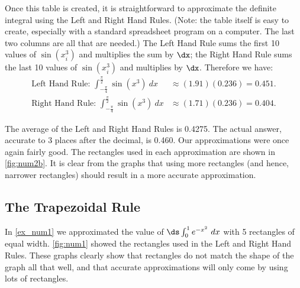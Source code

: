 {Once this table is created, it is straightforward to approximate the definite integral using the Left and Right Hand Rules. (Note: the table itself is easy to create, especially with a standard spreadsheet program on a computer. The last two columns are all that are needed.) The Left Hand Rule sums the first 10 values of $\sin(x_i^3)$ and multiplies the sum by $\dx$; the Right Hand Rule sums the last 10 values of $\sin(x_i^3)$ and multiplies by $\dx$. Therefore we have:
\begin{align*}
	\text{Left Hand Rule: }\int_{-\frac{\pi}4}^{\frac{\pi}2}\sin(x^3)\ dx
	& \approx (1.91)(0.236) = 0.451. \\
	\text{Right Hand Rule: }\int_{-\frac{\pi}4}^{\frac{\pi}2}\sin(x^3)\ dx
	&\approx (1.71)(0.236) = 0.404.
\end{align*}

The average of the Left and Right Hand Rules is 0.4275.  The actual answer, accurate to 3 places after the decimal, is 0.460. Our approximations were once again fairly good. The rectangles used in each approximation are shown in \autoref{fig:num2b}. It is clear from the graphs that using more rectangles (and hence, narrower rectangles) should result in a more accurate approximation.}

\subsection{The Trapezoidal Rule}

In \autoref{ex_num1} we approximated the value of $\ds \int_0^1 e^{-x^2}\ dx$ with 5 rectangles of equal width. \autoref{fig:num1} showed the rectangles used in the Left and Right Hand Rules. These graphs clearly show that rectangles do not match the shape of the graph all that well, and that accurate approximations will only come by using lots of rectangles. 


